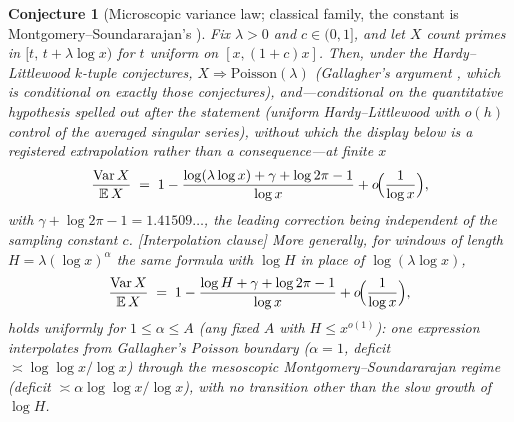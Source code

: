 \documentclass[11pt]{article}
\newtheorem{conjecture}{Conjecture}
\theoremstyle{definition}
\begin{document}
\setcounter{conjecture}{12}%
\begin{conjecture}[Microscopic variance law; classical family, the
constant is Montgomery--Soundararajan's \cite{MS}]\label{c20}
Fix $\lambda>0$ and $c\in(0,1]$, and let $X$ count primes in
$[t,\,t+\lambda\log x)$ for $t$ uniform on $[x,(1+c)x]$.  Then, under
the Hardy--Littlewood $k$-tuple conjectures,
$X\Rightarrow\mathrm{Poisson}(\lambda)$ (Gallagher's argument
\cite{Gallagher}, which is conditional on exactly those conjectures),
and---\emph{conditional on the quantitative hypothesis} spelled out
after the statement (uniform Hardy--Littlewood with $o(h)$ control
of the averaged singular series), without which the display
below is a registered extrapolation rather than a consequence---at
finite $x$
\[
\frac{\operatorname{Var}X}{\mathbb E\,X}
\;=\;1-\frac{\log(\lambda\log x)+\gamma+\log2\pi-1}{\log x}
+o\!\Bigl(\frac1{\log x}\Bigr),
\]
with $\gamma+\log2\pi-1=1.41509\ldots$, the leading correction being
independent of the sampling constant $c$.  [Interpolation clause]
More generally, for windows of length $H=\lambda(\log x)^{\alpha}$
the \emph{same} formula with $\log H$ in place of
$\log(\lambda\log x)$,
\[
\frac{\operatorname{Var}X}{\mathbb E\,X}
\;=\;1-\frac{\log H+\gamma+\log2\pi-1}{\log x}
+o\!\Bigl(\frac1{\log x}\Bigr),
\]
holds uniformly for $1\le\alpha\le A$ (any fixed $A$ with
$H\le x^{o(1)}$): one expression interpolates from Gallagher's
Poisson boundary ($\alpha=1$, deficit $\asymp\log\log x/\log x$)
through the mesoscopic Montgomery--Soundararajan regime (deficit
$\asymp\alpha\log\log x/\log x$), with no transition other than the
slow growth of $\log H$.
\end{conjecture}
\end{document}
